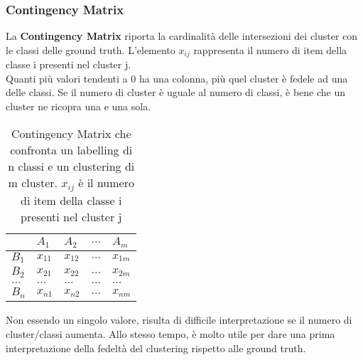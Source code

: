\subsubsection{Contingency Matrix}
La \textbf{Contingency Matrix} riporta la cardinalità delle intersezioni dei cluster con le classi delle ground truth. L'elemento $x_{ij}$ rappresenta il numero di item della classe i presenti nel cluster j.\\
Quanti più valori tendenti a 0 ha una colonna, più quel cluster è fedele ad una delle classi. Se il numero di cluster è uguale al numero di classi, è bene che un cluster ne ricopra una e una sola.\\
\begin{table}[H]
	\centering
	\begin{tabular}{l | l l l l}
		& $A_1$ & $A_2$ & $...$ & $A_m$\\
		\hline
		$B_1$ & $x_{11}$ & $x_{12}$ & $...$ & $x_{1m}$\\
		$B_2$& $x_{21}$ & $x_{22}$ & $...$ & $x_{2m}$\\
		$...$ & $...$ & $...$ & $...$ & $...$\\
		$B_n$& $x_{n1}$ & $x_{n2}$ & $...$ & $x_{nm}$
	\end{tabular}
	\caption{Contingency Matrix che confronta un labelling di n classi e un clustering di m cluster. $x_{ij}$ è il numero di item della classe i presenti nel cluster j}
	\label{tab:contingency}
\end{table} 
Non essendo un singolo valore, risulta di difficile interpretazione se il numero di cluster/classi aumenta. Allo stesso tempo, è molto utile per dare una prima interpretazione della fedeltà del clustering rispetto alle ground truth.

